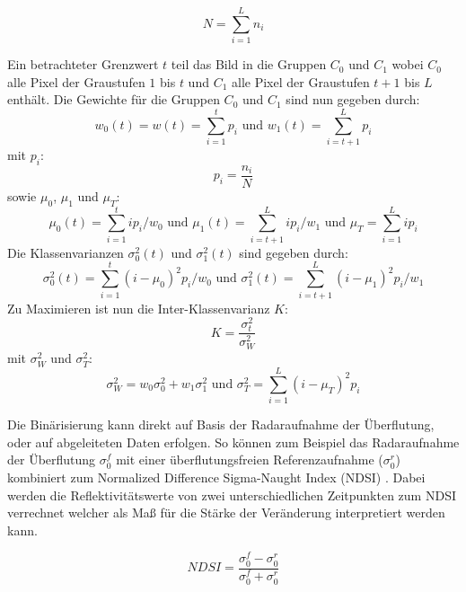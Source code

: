 \begin{equation}
    N = \sum_{i=1}^{L} n_i
\end{equation}

Ein betrachteter Grenzwert $t$ teil das Bild in die Gruppen $C_0$ und $C_1$ wobei $C_0$ alle Pixel der Graustufen $1$ bis $t$ und 
$C_1$ alle Pixel der Graustufen $t+1$ bis $L$ enthält. Die Gewichte für die Gruppen $C_0$ und $C_1$ sind nun gegeben durch:
\begin{equation}
    w_0(t) = w(t) = \sum_{i=1}^{t} p_i
    \text{   und   }
    w_1(t) = \sum_{i=t+1}^{L} p_i
\end{equation}
mit $p_i$: 
\begin{equation}
    p_i = \frac{n_i}{N}
\end{equation}
sowie $\mu_0$, $\mu_1$ und $\mu_T$:
\begin{equation}
    \mu_0(t) = \sum_{i=1}^{t} ip_i/w_0
    \text{   und   }
    \mu_1(t) = \sum_{i=t+1}^{L} ip_i/w_1
    \text{   und   }
    \mu_T = \sum_{i=1}^{L} ip_i
\end{equation}
Die Klassenvarianzen $\sigma_0^2(t)$ und $\sigma_1^2(t)$ sind gegeben durch:
\begin{equation}
    \sigma_0^2(t) =  \sum_{i=1}^{t} (i-\mu_0)^2p_i/w_0
    \text{   und   }
    \sigma_1^2(t) = \sum_{i=t+1}^{L} (i-\mu_1)^2p_i/w_1
\end{equation}
Zu Maximieren ist nun die Inter-Klassenvarianz $K$:
\begin{equation}
    K = \frac{\sigma_t^2}{\sigma_W^2}
\end{equation}
mit $\sigma_W^2$ und $\sigma_T^2$:
\begin{equation}
    \sigma_W^2 = w_0\sigma_0^2 + w_1\sigma_1^2
    \text{   und   }
    \sigma_T^2 = \sum_{i=1}^{L} (i-\mu_T)^2p_i
\end{equation}

Die Binärisierung kann direkt auf Basis der Radaraufnahme der Überflutung, oder auf abgeleiteten Daten erfolgen. So können zum Beispiel das Radaraufnahme der Überflutung
$\sigma_0^f$ mit einer überflutungsfreien Referenzaufnahme ($\sigma_0^r$) kombiniert zum Normalized Difference Sigma-Naught Index (NDSI) \cite{flood_proxy_mapping_ndsi}.
Dabei werden die Reflektivitätswerte von zwei unterschiedlichen Zeitpunkten zum NDSI verrechnet welcher als Maß für die Stärke der Veränderung interpretiert werden kann. 

\begin{equation}
    NDSI = \frac{\sigma_0^f-\sigma_0^r}{\sigma_0^f+\sigma_0^r}
\end{equation} 

